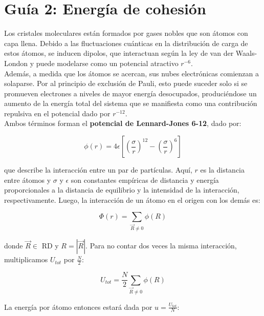 \documentclass[a4paper]{article}
\begin{document}
\section{Gu\'ia 2: Energ\'ia de cohesi\'on}

Los cristales moleculares est\'an formados por gases nobles que son \'atomos con capa llena. Debido a las fluctuaciones cu\'anticas en la distribuci\'on de carga de estos \'atomos, se inducen dipolos, que interactuan seg\'un la ley de van der Waals-London y puede modelarse como un potencial atractivo $r^{-6}$.\\

Adem\'as, a medida que los átomos se acercan, sus nubes electrónicas comienzan a solaparse. Por al principio de exclusi\'on de Pauli, esto puede suceder solo si se promueven electrones a niveles de mayor energ\'ia desocupados, produci\'endose un aumento de la energ\'ia total del sistema que se manifiesta como una contribución repulsiva en el potencial dado por $r^{-12}$.\\

Ambos t\'erminos forman el \textbf{potencial de Lennard-Jones 6-12}, dado por:

\begin{equation}
\label{eq:lj}
\phi(r) = 4\epsilon\left[\left( \frac{\sigma}{r}\right)^{12} - \left(\frac{\sigma}{r}\right)^{6} \right]
\end{equation}

que describe la interacción entre un par de part\'iculas. Aqu\'i, $r$ es la distancia entre \'atomos y $\sigma$ y $\epsilon$ son constantes emp\'iricas de distancia y energ\'ia proporcionales a la distancia de equilibrio y la intensidad de la interacci\'on, respectivamente. Luego, la interacci\'on de un \'atomo en el origen con los dem\'as es:

\begin{equation}
\label{eq:phi}
\Phi(r) = \sum_{\vec{R} \neq 0} \phi(R) 
\end{equation}

donde $\vec{R} \in$ RD  y $R = |\vec{R}|$. Para no contar dos veces la misma interacci\'on, multiplicamos $U_{tot}$ por $\frac{N}{2}$:

\begin{equation}
\label{eq:utot}
U_{tot} = \frac{N}{2}\sum_{\vec{R} \neq 0} \phi(R) 
\end{equation}

La energ\'ia por \'atomo entonces estar\'a dada por $u = \frac{U_{tot}}{N}$:
\end{document}
